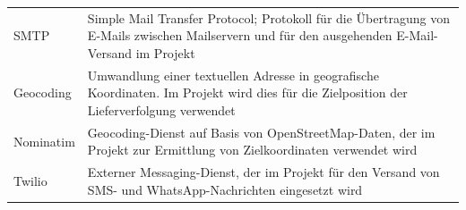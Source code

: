 \begin{longtable}{p{} p{}}
SMTP &
Simple Mail Transfer Protocol; Protokoll für die Übertragung von E-Mails zwischen Mailservern und für den ausgehenden E-Mail-Versand im Projekt \\

Geocoding &
Umwandlung einer textuellen Adresse in geografische Koordinaten. Im Projekt wird dies für die Zielposition der Lieferverfolgung verwendet \\

Nominatim &
Geocoding-Dienst auf Basis von OpenStreetMap-Daten, der im Projekt zur Ermittlung von Zielkoordinaten verwendet wird \\

Twilio &
Externer Messaging-Dienst, der im Projekt für den Versand von SMS- und WhatsApp-Nachrichten eingesetzt wird \\

\end{longtable}
